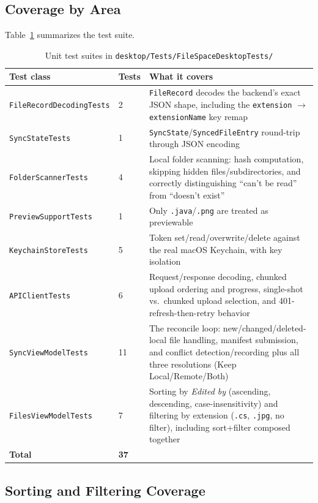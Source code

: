 \documentclass[12pt,a4paper]{article}
\begin{document}
\subsection{Coverage by Area}

Table~\ref{tab:tests} summarizes the test suite.

\small
\begin{longtable}{@{}p{4.8cm}p{1.2cm}p{9.2cm}@{}}
\caption{Unit test suites in \texttt{desktop/Tests/FileSpaceDesktopTests/}}
\label{tab:tests} \\
\toprule
\textbf{Test class} & \textbf{Tests} & \textbf{What it covers} \\
\midrule
\endhead
\texttt{FileRecord\-Decoding\-Tests} & 2 & \texttt{FileRecord} decodes the backend's exact JSON shape, including the \texttt{extension} $\to$ \texttt{extensionName} key remap \\
\texttt{SyncStateTests} & 1 & \texttt{SyncState}/\texttt{SyncedFileEntry} round-trip through JSON encoding \\
\texttt{FolderScannerTests} & 4 & Local folder scanning: hash computation, skipping hidden files/subdirectories, and correctly distinguishing ``can't be read'' from ``doesn't exist'' \\
\texttt{PreviewSupportTests} & 1 & Only \texttt{.java}/\texttt{.png} are treated as previewable \\
\texttt{KeychainStoreTests} & 5 & Token set/read/overwrite/delete against the real macOS Keychain, with key isolation \\
\texttt{APIClientTests} & 6 & Request/response decoding, chunked upload ordering and progress, single-shot vs.\ chunked upload selection, and 401-refresh-then-retry behavior \\
\texttt{SyncViewModelTests} & 11 & The reconcile loop: new/changed/deleted-local file handling, manifest submission, and conflict detection/recording plus all three resolutions (Keep Local/Remote/Both) \\
\texttt{FilesViewModelTests} & 7 & Sorting by \emph{Edited by} (ascending, descending, case-insensitivity) and filtering by extension (\texttt{.cs}, \texttt{.jpg}, no filter), including sort+filter composed together \\
\bottomrule
\textbf{Total} & \textbf{37} & \\
\end{longtable}

\subsection{Sorting and Filtering Coverage}
\label{sec:variant}
\end{document}
